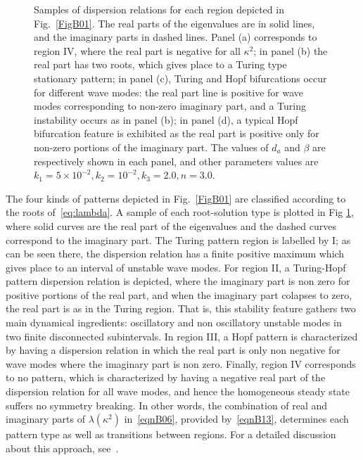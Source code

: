 \documentclass[%
 preprint,
 aip, 
 amsmath,amssymb,
]{revtex4-2}
\begin{document}
\begin{figure}[t!]
	\caption{Samples of dispersion relations for each region depicted in Fig.~\ref{FigB01}. The real parts of the eigenvalues are in solid lines, and the imaginary parts in dashed lines.  Panel (a) corresponds to region IV, where the real part is negative for all $\kappa^2$; in panel (b) the real part has two roots, which gives place to a Turing type stationary pattern; in panel (c), Turing and Hopf bifurcations occur for different wave modes: the real part line is positive for wave modes corresponding to non-zero imaginary part, and a Turing instability occurs as in panel (b); in  panel (d), a typical Hopf bifurcation feature is exhibited as the real part is positive only for non-zero portions of the imaginary part. The values of $d_a$ and $\beta$ are respectively shown in each panel, and other parameters values are $k_1=5\times10^{-2}, k_2=10^{-2}, k_3=2.0, n=3.0$.}
	\label{FigB02}
\end{figure}

The four kinds of patterns depicted in Fig.~\ref{FigB01} are classified according to the roots of~\eqref{eq:lambda}. A sample of each root-solution type is plotted in Fig \ref{FigB02}, where solid curves are  the real part of the eigenvalues and the dashed curves correspond to the imaginary part. The Turing pattern region is labelled by I; as can be seen there, the dispersion relation has a finite positive maximum which gives place to an interval of unstable wave modes. For region II, a Turing-Hopf pattern dispersion relation is depicted, where the imaginary part is non zero for positive portions of the real part, and when the imaginary part colapses to zero, the real part is as in the Turing region. That is, this stability feature gathers two main dynamical ingredients: oscillatory and non oscillatory unstable modes in two finite disconnected subintervals. In region III, a Hopf pattern is characterized by having a dispersion relation in which the real part is only non negative for wave modes where the imaginary part is non zero. Finally, region IV corresponds to no pattern, which is characterized by having a negative real part of the dispersion relation for all wave modes, and hence the homogeneous steady state suffers no symmetry breaking. In other words, the combination of real and imaginary parts of $\lambda(\kappa^2)$ in~\eqref{eqnB06}, provided by~\eqref{eqnB13}, determines each pattern type as well as transitions between regions. For a detailed discussion about  this approach, see~\cite{liu}.
\end{document}
